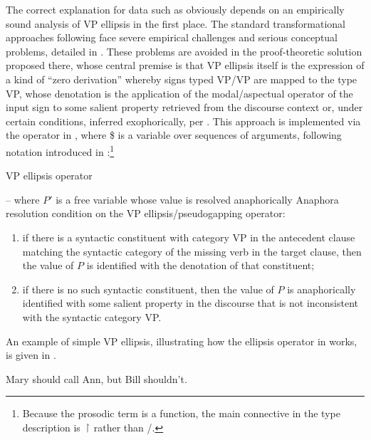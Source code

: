\documentclass[output=paper,colorlinks,citecolor=brown]{langscibook}
\begin{document}
The correct explanation for data such as  obviously
depends on an empirically sound analysis of VP ellipsis in the first
place. The standard transformational approaches following \citet{kuno1981}
face severe empirical challenges and serious conceptual problems,
detailed in \citet{kubota-levine-pseudo}. These problems are avoided in the
proof-theoretic solution proposed there, whose central premise is that VP
ellipsis itself is the expression of a kind of ``zero derivation''
whereby signs typed VP/VP are mapped to the type VP, whose denotation
is the application of the modal/aspectual operator of the input sign
to some salient property retrieved from the discourse context or,
under certain conditions, inferred exophorically, per
\citet{MillerPullum13}. This approach is implemented via the operator in
, where \$ is a variable over sequences of arguments,
following notation introduced in :\footnote{Because the
prosodic term is a function, the main connective in the type
description is \ensuremath{\vs} rather than /.}

\begin{exe}
 \ex\label{ellipseOp1}
  VP ellipsis operator\\

   -- where $P'$ is a free variable whose value is
  resolved anaphorically
 \ex
  Anaphora resolution condition on the VP ellipsis/pseudogapping
  operator:
  \begin{enumerate}
   \item
    if there is a syntactic  constituent
    with category VP in the antecedent clause matching the
    syntactic  category of the missing verb in the target clause,
    then the value of $P$ is identified with the denotation of that constituent;
   \item
    if there is no such syntactic  constituent, then the value of $P$  is anaphorically
    identified with some salient property in the discourse that is not
    inconsistent with the syntactic  category VP.
  \end{enumerate}
\end{exe}
An example of simple VP ellipsis, illustrating how the ellipsis operator
in  works, is given in .

\begin{exe}
 \ex\label{simpleVPE}    Mary should call Ann, but Bill shouldn't.
\end{exe}
\end{document}
